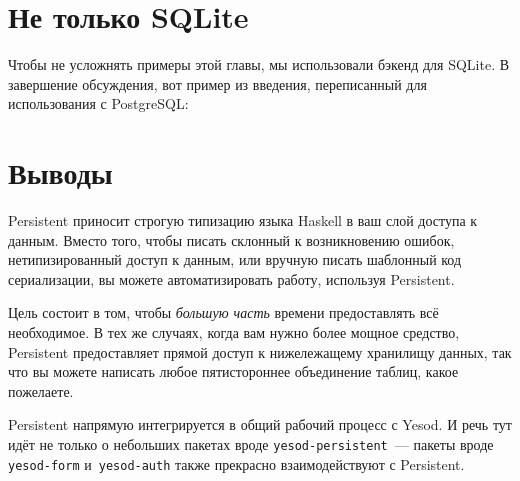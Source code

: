 \section{Не только SQLite}
Чтобы не усложнять примеры этой главы, мы использовали бэкенд для SQLite. В
завершение обсуждения, вот пример из введения, переписанный для использования с
PostgreSQL:


\section{Выводы}

Persistent приносит строгую типизацию языка Haskell в ваш слой доступа к
данным. Вместо того, чтобы писать склонный к возникновению ошибок,
нетипизированный доступ к данным, или вручную писать шаблонный код
сериализации, вы можете автоматизировать работу, используя Persistent.

Цель состоит в том, чтобы \emph{большую часть} времени предоставлять всё
необходимое. В тех же случаях, когда вам нужно более мощное средство,
Persistent предоставляет прямой доступ к нижележащему хранилищу данных, так что
вы можете написать любое пятистороннее объединение таблиц, какое пожелаете.

Persistent напрямую интегрируется в общий рабочий процесс с Yesod. И речь тут
идёт не только о небольших пакетах вроде \texttt{yesod-persistent}~--- пакеты
вроде \texttt{yesod-form} и~\texttt{yesod-auth} также прекрасно взаимодействуют
с Persistent.
